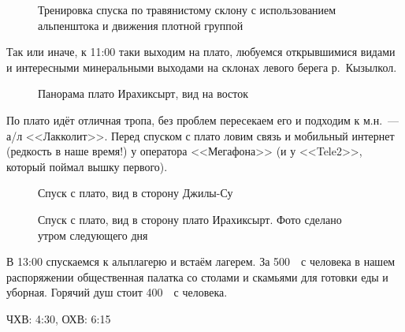 \begin{figure}[h!]
	\centering
	\caption{Тренировка спуска по травянистому склону с использованием альпенштока и движения плотной группой}
	\label{fig:trenya}
\end{figure}



Так или иначе, к 11:00 таки выходим на плато, любуемся открывшимися видами и интересными минеральными выходами на склонах левого берега р.~Кызылкол.

\begin{figure}[h!]
	\centering
	\caption{Панорама плато Ирахиксырт, вид на восток}
	\label{fig:plauteau}
\end{figure}

По плато идёт отличная тропа, без проблем пересекаем его и подходим к м.н.~--- а/л <<Лакколит>>. Перед спуском с плато ловим связь и мобильный интернет (редкость в наше время!) у оператора <<Мегафона>> (и у <<Tele2>>, который поймал вышку первого).

\begin{figure}[h!]
	\centering
	\caption{Спуск с плато, вид в сторону Джилы-Су}
	\label{fig:lakkolit}
\end{figure}

\begin{figure}[h!]
	\centering
	\caption{Спуск с плато, вид в сторону плато Ирахиксырт. Фото сделано утром следующего дня}
	\label{fig:lakkolit2}
\end{figure}

В 13:00 спускаемся к альплагерю и встаём лагерем. За 500~\faRub~с человека в нашем распоряжении общественная палатка со столами и скамьями для готовки еды и уборная. Горячий душ стоит 400~\faRub~с человека.

ЧХВ: 4:30, ОХВ: 6:15

\clearpage